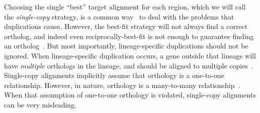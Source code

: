 \documentclass[fleqn,10pt]{wlscirep}
\begin{document}
Choosing the single ``best'' target alignment for each region, which we will call the \emph{single-copy} strategy, is a common way~\cite{blastz,tba} to deal with the problems that duplications cause.
However, the best-fit strategy will not always find a correct ortholog, and indeed even reciprocally-best-fit is not enough to guarantee finding an ortholog~\cite{recipBestOrtholog}.
But most importantly, lineage-specific duplications should not be ignored.
When lineage-specific duplication occurs, a gene outside that lineage will have \emph{multiple} orthologs in the lineage, and should be aligned to multiple copies~\cite{Koonin2005}.
Single-copy alignments implicitly assume that orthology is a one-to-one relationship.
However, in nature, orthology is a many-to-many relationship~\cite{Koonin2005}.
When that assumption of one-to-one orthology is violated, single-copy alignments can be very misleading.
\end{document}

